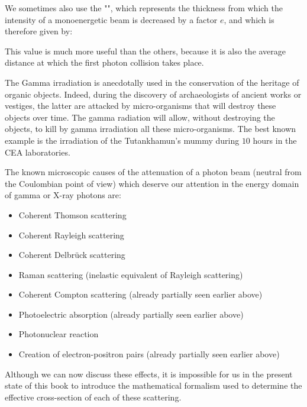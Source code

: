 	We sometimes also use the "", which represents the thickness from which the intensity of a monoenergetic beam is decreased by a factor $e$, and which is therefore given by:
	
	This value is much more useful than the others, because it is also the average distance at which the first photon collision takes place.
	\begin{tcolorbox}[title=Remark,colframe=black,arc=10pt]
	The Gamma irradiation is anecdotally used in the conservation of the heritage of organic objects. Indeed, during the discovery of archaeologists of ancient works or vestiges, the latter are attacked by micro-organisms that will destroy these objects over time. The gamma radiation will allow, without destroying the objects, to kill by gamma irradiation all these micro-organisms. The best known example is the irradiation of the Tutankhamun's mummy during $10$ hours in the CEA laboratories.
	\end{tcolorbox}
	The known microscopic causes of the attenuation of a photon beam (neutral from the Coulombian point of view) which deserve our attention in the energy domain of gamma or X-ray photons are:
	\begin{itemize}
		\item Coherent Thomson scattering

		\item Coherent Rayleigh scattering

		\item Coherent Delbrück scattering

		\item Raman scattering (inelastic equivalent of Rayleigh scattering)

		\item Coherent Compton scattering (already partially seen earlier above)

		\item Photoelectric absorption (already partially seen earlier above)

		\item Photonuclear reaction

		\item Creation of electron-positron pairs (already partially seen earlier above)
	\end{itemize}
	Although we can now discuss these effects, it is impossible for us in the present state of this book to introduce the mathematical formalism used to determine the effective cross-section of each of these scattering.
	

